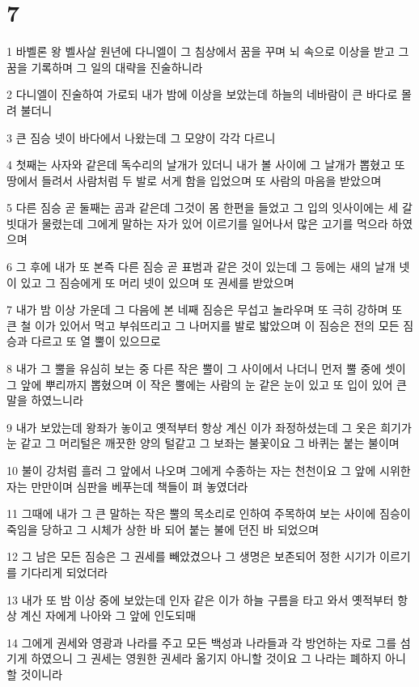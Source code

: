 \chapter{7}

\par 1 바벨론 왕 벨사살 원년에 다니엘이 그 침상에서 꿈을 꾸며 뇌 속으로 이상을 받고 그 꿈을 기록하며 그 일의 대략을 진술하니라
\par 2 다니엘이 진술하여 가로되 내가 밤에 이상을 보았는데 하늘의 네바람이 큰 바다로 몰려 불더니
\par 3 큰 짐승 넷이 바다에서 나왔는데 그 모양이 각각 다르니
\par 4 첫째는 사자와 같은데 독수리의 날개가 있더니 내가 볼 사이에 그 날개가 뽑혔고 또 땅에서 들려서 사람처럼 두 발로 서게 함을 입었으며 또 사람의 마음을 받았으며
\par 5 다른 짐승 곧 둘째는 곰과 같은데 그것이 몸 한편을 들었고 그 입의 잇사이에는 세 갈빗대가 물렸는데 그에게 말하는 자가 있어 이르기를 일어나서 많은 고기를 먹으라 하였으며
\par 6 그 후에 내가 또 본즉 다른 짐승 곧 표범과 같은 것이 있는데 그 등에는 새의 날개 넷이 있고 그 짐승에게 또 머리 넷이 있으며 또 권세를 받았으며
\par 7 내가 밤 이상 가운데 그 다음에 본 네째 짐승은 무섭고 놀라우며 또 극히 강하며 또 큰 철 이가 있어서 먹고 부숴뜨리고 그 나머지를 발로 밟았으며 이 짐승은 전의 모든 짐승과 다르고 또 열 뿔이 있으므로
\par 8 내가 그 뿔을 유심히 보는 중 다른 작은 뿔이 그 사이에서 나더니 먼저 뿔 중에 셋이 그 앞에 뿌리까지 뽑혔으며 이 작은 뿔에는 사람의 눈 같은 눈이 있고 또 입이 있어 큰 말을 하였느니라
\par 9 내가 보았는데 왕좌가 놓이고 옛적부터 항상 계신 이가 좌정하셨는데 그 옷은 희기가 눈 같고 그 머리털은 깨끗한 양의 털같고 그 보좌는 불꽃이요 그 바퀴는 붙는 불이며
\par 10 불이 강처럼 흘러 그 앞에서 나오며 그에게 수종하는 자는 천천이요 그 앞에 시위한 자는 만만이며 심판을 베푸는데 책들이 펴 놓였더라
\par 11 그때에 내가 그 큰 말하는 작은 뿔의 목소리로 인하여 주목하여 보는 사이에 짐승이 죽임을 당하고 그 시체가 상한 바 되어 붙는 불에 던진 바 되었으며
\par 12 그 남은 모든 짐승은 그 권세를 빼았겼으나 그 생명은 보존되어 정한 시기가 이르기를 기다리게 되었더라
\par 13 내가 또 밤 이상 중에 보았는데 인자 같은 이가 하늘 구름을 타고 와서 옛적부터 항상 계신 자에게 나아와 그 앞에 인도되매
\par 14 그에게 권세와 영광과 나라를 주고 모든 백성과 나라들과 각 방언하는 자로 그를 섬기게 하였으니 그 권세는 영원한 권세라 옮기지 아니할 것이요 그 나라는 폐하지 아니할 것이니라
